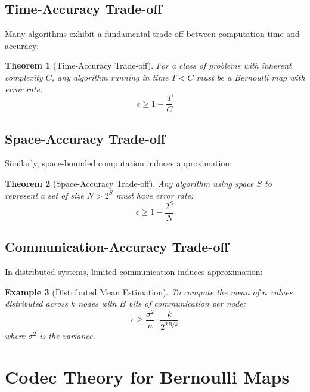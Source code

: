 \documentclass[11pt,final,hidelinks]{article}
\newtheorem{theorem}{Theorem}[section]
\newtheorem{example}[theorem]{Example}
\newcommand{\error}{\epsilon}
\begin{document}
\subsection{Time-Accuracy Trade-off}

Many algorithms exhibit a fundamental trade-off between computation time and accuracy:

\begin{theorem}[Time-Accuracy Trade-off]
For a class of problems with inherent complexity $C$, any algorithm running in time $T < C$ must be a Bernoulli map with error rate:
\begin{equation}
\error \geq 1 - \frac{T}{C}
\end{equation}
\end{theorem}

\subsection{Space-Accuracy Trade-off}

Similarly, space-bounded computation induces approximation:

\begin{theorem}[Space-Accuracy Trade-off]
Any algorithm using space $S$ to represent a set of size $N > 2^S$ must have error rate:
\begin{equation}
\error \geq 1 - \frac{2^S}{N}
\end{equation}
\end{theorem}

\subsection{Communication-Accuracy Trade-off}

In distributed systems, limited communication induces approximation:

\begin{example}[Distributed Mean Estimation]
To compute the mean of $n$ values distributed across $k$ nodes with $B$ bits of communication per node:
\begin{equation}
\error \geq \frac{\sigma^2}{n} \cdot \frac{k}{2^{2B/k}}
\end{equation}
where $\sigma^2$ is the variance.
\end{example}

\section{Codec Theory for Bernoulli Maps}
\end{document}
